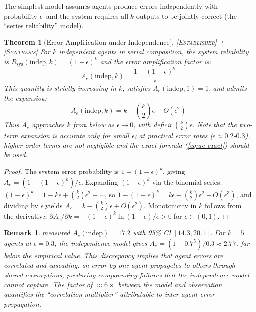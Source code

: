 \documentclass[11pt, a4paper, copyright]{googledeepmind}
\newtheorem{theorem}{Theorem}[section]
\newtheorem*{remark}{Remark}
\newcommand{\established}{\textsc{[Established]}}
\newcommand{\synthesis}{\textsc{[Synthesis]}}
\begin{document}
The simplest model assumes agents produce errors independently with probability $\epsilon$, and the system requires all $k$ outputs to be jointly correct (the ``series reliability'' model).

\begin{theorem}[Error Amplification under Independence] \established{} + \synthesis{}
\label{thm:error-amp}
For $k$ independent agents in serial composition, the system reliability is $R_{\mathrm{sys}}(\mathrm{indep}, k) = (1 - \epsilon)^k$ and the error amplification factor is:
\begin{equation}
\label{eq:ae-exact}
  A_e(\mathrm{indep}, k) = \frac{1 - (1-\epsilon)^k}{\epsilon}
\end{equation}
This quantity is strictly increasing in $k$, satisfies $A_e(\mathrm{indep}, 1) = 1$, and admits the expansion:
\begin{equation}
\label{eq:ae-expansion}
  A_e(\mathrm{indep}, k) = k - \binom{k}{2}\epsilon + O(\epsilon^2)
\end{equation}
Thus $A_e$ approaches $k$ from below as $\epsilon \to 0$, with deficit $\binom{k}{2}\epsilon$.
Note that the two-term expansion is accurate only for small $\epsilon$; at practical error rates ($\epsilon \approx 0.2$-$0.3$), higher-order terms are not negligible and the exact formula (\ref{eq:ae-exact}) should be used.
\end{theorem}

\begin{proof}
The system error probability is $1 - (1-\epsilon)^k$, giving $A_e = (1 - (1-\epsilon)^k)/\epsilon$.
Expanding $(1-\epsilon)^k$ via the binomial series:
$(1-\epsilon)^k = 1 - k\epsilon + \binom{k}{2}\epsilon^2 - \cdots$,
so $1 - (1-\epsilon)^k = k\epsilon - \binom{k}{2}\epsilon^2 + O(\epsilon^3)$,
and dividing by $\epsilon$ yields $A_e = k - \binom{k}{2}\epsilon + O(\epsilon^2)$.
Monotonicity in $k$ follows from the derivative: $\partial A_e / \partial k = -(1-\epsilon)^k \ln(1-\epsilon)/\epsilon > 0$ for $\epsilon \in (0,1)$.
\end{proof}

\begin{remark}
\label{rem:discrepancy}
\citet{Kim2025} measured $A_e(\mathrm{indep}) = 17.2$ with 95\% CI $[14.3, 20.1]$.
For $k = 5$ agents at $\epsilon = 0.3$, the independence model gives $A_e = (1 - 0.7^5)/0.3 \approx 2.77$, far below the empirical value.
This discrepancy implies that agent errors are correlated and cascading: an error by one agent propagates to others through shared assumptions, producing compounding failures that the independence model cannot capture.
The factor of $\approx 6\times$ between the model and observation quantifies the ``correlation multiplier'' attributable to inter-agent error propagation.
\end{remark}
\end{document}
